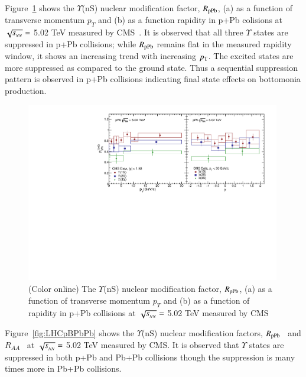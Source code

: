 Figure~\ref{fig:LHCpPb5} shows the $\Upsilon$(nS) nuclear modification factor, $R_{\rm pPb}$,
(a) as a function of transverse momentum $p_{T}$
and (b) as a function rapidity in p+Pb colisions at $\sqrt{s_{_{NN}}} =$ 5.02 TeV measured by CMS~\cite{CMS:2022wfi}.
It is observed that all three $\Upsilon$ states are suppressed in p+Pb collisions; while
$R_{\rm pPb}$ remains flat in the measured rapidity window, it shows an increasing trend with
increasing $p_{\rm T}$. The excited states are more suppressed as compared to the ground state.
Thus a sequential suppression pattern is observed in p+Pb collisions indicating final
state effects on bottomonia production. 

\begin{figure}
  \includegraphics[width=0.99\textwidth]{Figures/Fig12_LHC_YnSRPPbPtRap.pdf}
  \caption{(Color online) The $\Upsilon$(nS) nuclear modification factor, $R_{\rm pPb}$,
    (a) as a function of transverse momentum $p_{T}$
    and (b) as a function of rapidity in p+Pb collisions at $\sqrt{s_{_{NN}}} =$ 5.02 TeV measured by CMS~\cite{CMS:2022wfi}
  }
  \label{fig:LHCpPb5}
\end{figure}

Figure~\ref{fig:LHCpBPbPb} shows the $\Upsilon$(nS) nuclear modification factors,
$R_{\rm pPb}$~\cite{CMS:2022wfi} and $R_{AA}$~\cite{CMS:2018zza}
at $\sqrt{s_{_{NN}}} =$ 5.02 TeV measured by CMS. It is observed that $\Upsilon$ states are suppressed
in both p+Pb and Pb+Pb collisions though the suppression is many times more in Pb+Pb collisions. 


